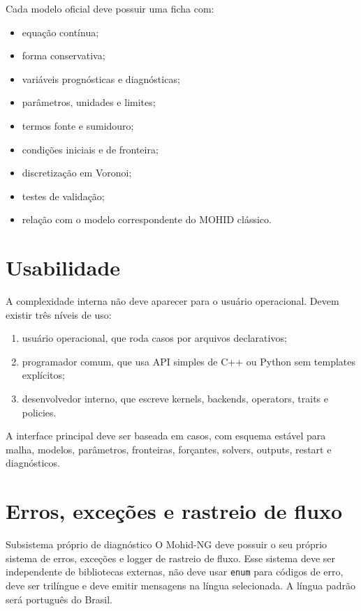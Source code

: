 \documentclass[11pt,a4paper]{article}
\begin{document}
Cada modelo oficial deve possuir uma ficha com:
\begin{itemize}
  \item equa\c{c}\~ao cont\'inua;
  \item forma conservativa;
  \item vari\'aveis progn\'osticas e diagn\'osticas;
  \item par\^ametros, unidades e limites;
  \item termos fonte e sumidouro;
  \item condi\c{c}\~oes iniciais e de fronteira;
  \item discretiza\c{c}\~ao em Voronoi;
  \item testes de valida\c{c}\~ao;
  \item rela\c{c}\~ao com o modelo correspondente do MOHID cl\'assico.
\end{itemize}

\section{Usabilidade}

A complexidade interna n\~ao deve aparecer para o usu\'ario operacional. Devem existir tr\^es n\'iveis de uso:
\begin{enumerate}
  \item usu\'ario operacional, que roda casos por arquivos declarativos;
  \item programador comum, que usa API simples de C++ ou Python sem templates expl\'icitos;
  \item desenvolvedor interno, que escreve kernels, backends, operators, traits e policies.
\end{enumerate}

A interface principal deve ser baseada em casos, com esquema est\'avel para malha, modelos, par\^ametros, fronteiras, for\c{c}antes, solvers, outputs, restart e diagn\'osticos.


\section{Erros, exce\c{c}\~oes e rastreio de fluxo}

\begin{decisionbox}{Subsistema pr\'oprio de diagn\'ostico}
O Mohid-NG deve possuir o seu pr\'oprio sistema de erros, exce\c{c}\~oes e logger de rastreio de fluxo. Esse sistema deve ser independente de bibliotecas externas, n\~ao deve usar \texttt{enum} para c\'odigos de erro, deve ser tril\'ingue e deve emitir mensagens na l\'ingua selecionada. A l\'ingua padr\~ao ser\'a portugu\^es do Brasil.
\end{decisionbox}
\end{document}
